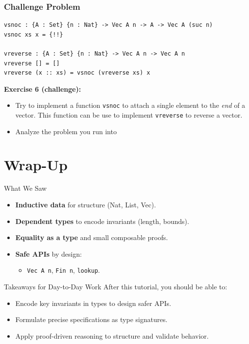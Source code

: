 \documentclass[aspectratio=169]{beamer}
\begin{document}
\begin{frame}
  \frametitle{Challenge Problem}
\begin{lstlisting}
vsnoc : {A : Set} {n : Nat} -> Vec A n -> A -> Vec A (suc n)
vsnoc xs x = {!!}

vreverse : {A : Set} {n : Nat} -> Vec A n -> Vec A n
vreverse [] = []
vreverse (x :: xs) = vsnoc (vreverse xs) x
\end{lstlisting}
  \vfill
  \textbf{Exercise 6 (challenge):}
  \begin{itemize}
    \item Try to implement a function \texttt{vsnoc} to attach a single
      element to the \emph{end} of a vector. This function can be use
      to implement \texttt{vreverse} to  reverse a vector.
    \item Analyze the problem you run into
  \end{itemize}
\end{frame}
\section{Wrap-Up}

\begin{frame}{What We Saw}
  \begin{itemize}
    \item \textbf{Inductive data} for structure (Nat, List, Vec).
    \item \textbf{Dependent types} to encode invariants (length, bounds).
    \item \textbf{Equality as a type} and small composable proofs.
    \item \textbf{Safe APIs} by design:
      \begin{itemize}
        \item \texttt{Vec A n}, \texttt{Fin n}, \texttt{lookup}.
      \end{itemize}
  \end{itemize}
\end{frame}

\begin{frame}{Takeaways for Day-to-Day Work}
  After this tutorial, you should be able to:
  \begin{itemize}
    \item Encode key invariants in types to design safer APIs.
    \item Formulate precise specifications as type signatures.
    \item Apply proof-driven reasoning to structure and validate behavior.
  \end{itemize}
\end{frame}
\end{document}

